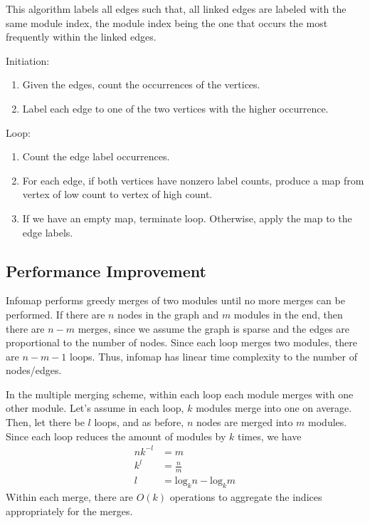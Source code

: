 \documentclass[12pt,a4paper]{article}
\begin{document}
This algorithm labels all edges such that, all linked edges are labeled with the same module index, the module index being the one that occurs the most frequently within the linked edges.

Initiation:
\begin{enumerate}
    \item Given the edges, count the occurrences of the vertices.
    \item Label each edge to one of the two vertices with the higher occurrence.
\end{enumerate}

Loop:
\begin{enumerate}
    \item Count the edge label occurrences.
    \item For each edge, if both vertices have nonzero label counts, produce a map from vertex of low count to vertex of high count.
    \item If we have an empty map, terminate loop. Otherwise, apply the map to the edge labels.
\end{enumerate}

\subsection{Performance Improvement}

Infomap performs greedy merges of two modules until no more merges can be performed. If there are \(n\) nodes in the graph and \(m\) modules in the end, then there are \(n-m\) merges, since we assume the graph is sparse and the edges are proportional to the number of nodes. Since each loop merges two modules, there are \(n-m-1\) loops. Thus, infomap has linear time complexity to the number of nodes/edges.

In the multiple merging scheme, within each loop each module merges with one other module. Let's assume in each loop, \(k\) modules merge into one on average. Then, let there be \(l\) loops, and as before, \(n\) nodes are merged into \(m\) modules. Since each loop reduces the amount of modules by \(k\) times, we have
\begin{align}
    n k^{-l} &= m \\
    k^l &= \frac{n}{m} \\
    l &= \mathrm{log}_k n -\mathrm{log}_k m
\end{align}
Within each merge, there are \(O(k)\) operations to aggregate the indices appropriately for the merges.
\end{document}
